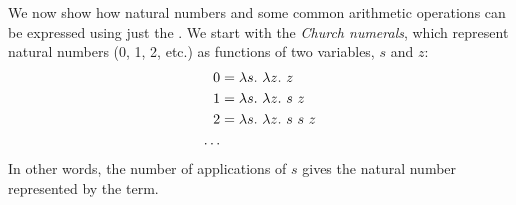 \documentclass[12pt]{report}
\begin{document}





We now show how natural numbers and some common arithmetic operations
can be expressed using just the \lamA. We start with the \emph{Church
  numerals}, which represent natural numbers (0, 1, 2, etc.) as functions
of two variables, $s$ and $z$:
\begin{equation}
  \begin{split}
    0 &= \lambda s.\ \lambda z.\ z \\
    1 &= \lambda s.\ \lambda z.\ s\ z \\
    2 &= \lambda s.\ \lambda z.\ s\ s\ z \\
    \ldots
  \end{split}
  \label{lang_eq_nats}
\end{equation}
In other words, the number of applications of $s$ gives the natural
number represented by the term. 
\end{document}
